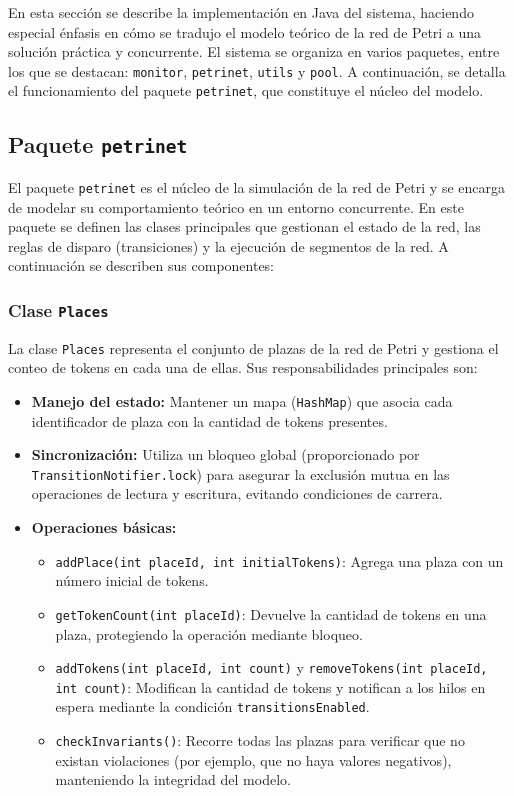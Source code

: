 \documentclass[12pt]{article}
\begin{document}
En esta sección se describe la implementación en Java del sistema, haciendo especial énfasis en cómo se tradujo el modelo teórico de la red de Petri a una solución práctica y concurrente. El sistema se organiza en varios paquetes, entre los que se destacan: \texttt{monitor}, \texttt{petrinet}, \texttt{utils} y \texttt{pool}. A continuación, se detalla el funcionamiento del paquete \texttt{petrinet}, que constituye el núcleo del modelo.

\subsection{Paquete \texttt{petrinet}}

El paquete \texttt{petrinet} es el núcleo de la simulación de la red de Petri y se encarga de modelar su comportamiento teórico en un entorno concurrente. En este paquete se definen las clases principales que gestionan el estado de la red, las reglas de disparo (transiciones) y la ejecución de segmentos de la red. A continuación se describen sus componentes:

\subsubsection{Clase \texttt{Places}}

La clase \texttt{Places} representa el conjunto de plazas de la red de Petri y gestiona el conteo de tokens en cada una de ellas. Sus responsabilidades principales son:
\begin{itemize}
    \item \textbf{Manejo del estado:} Mantener un mapa (\texttt{HashMap}) que asocia cada identificador de plaza con la cantidad de tokens presentes.
    \item \textbf{Sincronización:} Utiliza un bloqueo global (proporcionado por \texttt{TransitionNotifier.lock}) para asegurar la exclusión mutua en las operaciones de lectura y escritura, evitando condiciones de carrera.
    \item \textbf{Operaciones básicas:} 
    \begin{itemize}
        \item \texttt{addPlace(int placeId, int initialTokens)}: Agrega una plaza con un número inicial de tokens.
        \item \texttt{getTokenCount(int placeId)}: Devuelve la cantidad de tokens en una plaza, protegiendo la operación mediante bloqueo.
        \item \texttt{addTokens(int placeId, int count)} y \texttt{removeTokens(int placeId, int count)}: Modifican la cantidad de tokens y notifican a los hilos en espera mediante la condición \texttt{transitionsEnabled}.
        \item \texttt{checkInvariants()}: Recorre todas las plazas para verificar que no existan violaciones (por ejemplo, que no haya valores negativos), manteniendo la integridad del modelo.
    \end{itemize}
\end{itemize}
\end{document}
